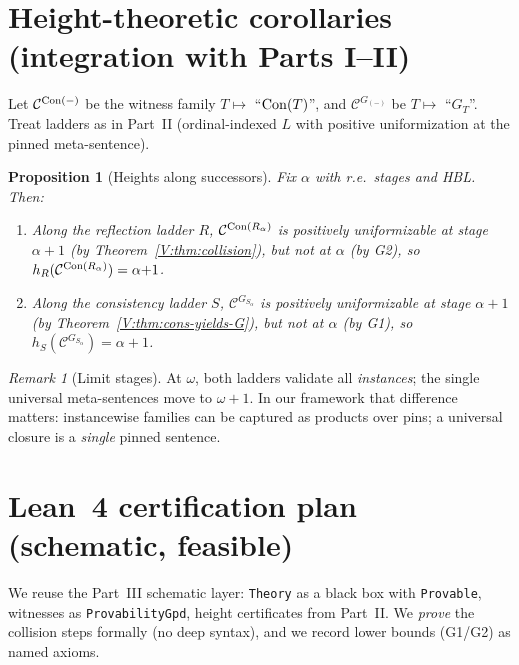 \documentclass[11pt]{article}
\newtheorem{proposition}[theorem]{Proposition}
\theoremstyle{definition}
\theoremstyle{remark}
\newtheorem{remark}[theorem]{Remark}
\begin{document}
\section{Height-theoretic corollaries (integration with Parts I–II)}

Let \(\mathcal C^{\mathrm{Con}(-)}\) be the witness family \(T\mapsto\) “\(\mathrm{Con}(T)\)”, and \(\mathcal C^{G_{(-)}}\) be \(T\mapsto\) “\(G_T\)”.
Treat ladders as in Part~II (ordinal-indexed \(L\) with positive uniformization at the pinned meta-sentence).

\begin{proposition}[Heights along successors]
Fix \(\alpha\) with r.e.\ stages and HBL. Then:
\begin{enumerate}
\item Along the reflection ladder \(R\), \(\mathcal C^{\mathrm{Con}(R_\alpha)}\) is positively uniformizable at stage \(\alpha{+}1\) (by Theorem~\ref{V:thm:collision}), but not at \(\alpha\) (by G2), so \(h_R(\mathcal C^{\mathrm{Con}(R_\alpha)})=\alpha{+}1\).
\item Along the consistency ladder \(S\), \(\mathcal C^{G_{S_\alpha}}\) is positively uniformizable at stage \(\alpha{+}1\) (by Theorem~\ref{V:thm:cons-yields-G}), but not at \(\alpha\) (by G1), so \(h_S(\mathcal C^{G_{S_\alpha}})=\alpha{+}1\).
\end{enumerate}
\end{proposition}

\begin{remark}[Limit stages]
At \(\omega\), both ladders validate all \emph{instances}; the single universal meta-sentences move to \(\omega{+}1\).
In our framework that difference matters: instancewise families can be captured as products over pins;
a universal closure is a \emph{single} pinned sentence.
\end{remark}

\section{Lean~4 certification plan (schematic, feasible)}

We reuse the Part~III schematic layer: \texttt{Theory} as a black box with \texttt{Provable}, witnesses as \texttt{ProvabilityGpd}, height certificates from Part~II. We \emph{prove} the collision steps formally (no deep syntax), and we record lower bounds (G1/G2) as named axioms.
\end{document}
